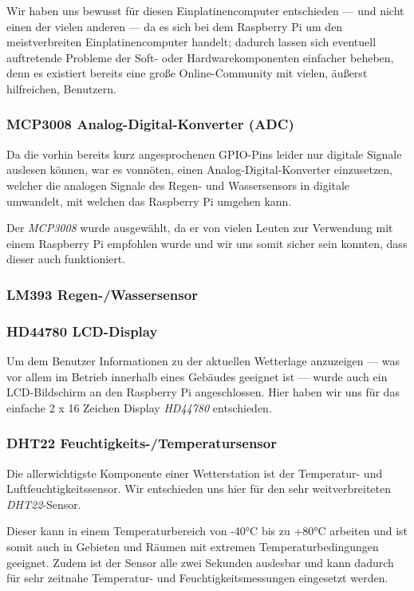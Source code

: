 \documentclass[a4paper,12pt]{article}
\begin{document}
Wir haben uns bewusst für diesen Einplatinencomputer entschieden — und nicht einen der vielen anderen — da es sich bei dem Raspberry Pi um den meistverbreiten Einplatinencomputer handelt; dadurch lassen sich eventuell auftretende Probleme der Soft- oder Hardwarekomponenten einfacher beheben, denn es existiert bereits eine große Online-Community mit vielen, äußerst hilfreichen, Benutzern.

\subsubsection{MCP3008 Analog-Digital-Konverter (ADC)}
Da die vorhin bereits kurz angesprochenen GPIO-Pins leider nur digitale Signale auslesen können, war es vonnöten, einen Analog-Digital-Konverter einzusetzen, welcher die analogen Signale des Regen- und Wassersensors in digitale umwandelt, mit welchen das Raspberry Pi umgehen kann.

Der \textit{MCP3008} wurde ausgewählt, da er von vielen Leuten zur Verwendung mit einem Raspberry Pi empfohlen wurde und wir uns somit sicher sein konnten, dass dieser auch funktioniert.

\subsubsection{LM393 Regen-/Wassersensor}


\subsubsection{HD44780 LCD-Display}
Um dem Benutzer Informationen zu der aktuellen Wetterlage anzuzeigen — was vor allem im Betrieb innerhalb eines Gebäudes geeignet ist — wurde auch ein LCD-Bildschirm an den Raspberry Pi angeschlossen.
Hier haben wir uns für das einfache 2 x 16 Zeichen Display \textit{HD44780} entschieden.

\subsubsection{DHT22 Feuchtigkeits-/Temperatursensor}
Die allerwichtigste Komponente einer Wetterstation ist der Temperatur- und Luftfeuchtigkeitssensor. Wir entschieden uns hier für den sehr weitverbreiteten \textit{DHT22}-Sensor. 

Dieser kann in einem Temperaturbereich von -40°C bis zu +80°C arbeiten und ist somit auch in Gebieten und Räumen mit extremen Temperaturbedingungen geeignet. Zudem ist der Sensor alle zwei Sekunden auslesbar und kann dadurch für sehr zeitnahe Temperatur- und Feuchtigkeitsmessungen eingesetzt werden.
\pagebreak
\end{document}
